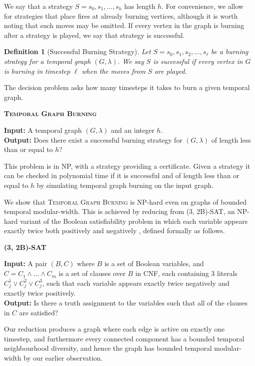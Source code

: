 \documentclass[preprint,12pt]{elsarticle}
\makeatletter
\newtheorem{definition}{Definition}
\newcommand{\decisionproblem}[3]{%
\begin{framed}
\vspace{0,1cm} \noindent
 \textbf{\textsc{#1} }
\par%
\noindent
{\bf{Input:}}  #2\\%
{\bf{Output:}} #3%
\end{framed}
}
\makeatother
\begin{document}
We say that a strategy $S = s_0, s_1, ..., s_h$ has length $h$. For convenience, we allow for strategies that place fires at already burning vertices, although it is worth noting that such moves may be omitted. If every vertex in the graph is burning after a strategy is played, we say that strategy is successful.

\begin{definition}[Successful Burning Strategy]
\label{def:burnstrat}
Let $S = s_0, s_1, s_2, ..., s_\ell$ be a burning strategy for a temporal graph $(G, \lambda)$. We say $S$ is \emph{successful} if every vertex in $G$ is burning in timestep $\ell$ when the moves from $S$ are played.
\end{definition}

The decision problem asks how many timesteps it takes to burn a given temporal graph.

\decisionproblem{Temporal Graph Burning}{A temporal graph $(G, \lambda)$ and an integer $h$.}{Does there exist a  successful burning strategy for $(G, \lambda)$ of length less than or equal to $h$?}

This problem is in NP, with a strategy providing a certificate. Given a strategy it can be checked in polynomial time if it is successful and of length less than or equal to $h$ by simulating temporal graph burning on the input graph.

We show that \textsc{Temporal Graph Burning} is NP-hard even on graphs of bounded temporal modular-width. This is achieved by reducing from \textsc{(3, 2B)-SAT}, an NP-hard variant of the Boolean satisfiability problem in which each variable appears exactly twice both positively and negatively \cite{DBLP:journals/eccc/ECCC-TR03-049}, defined formally as follows. 

\decisionproblem{(3, 2B)-SAT}{A pair $(B, C)$ where $B$ is a set of Boolean variables, and $C=C_1 \land ... \land C_m$ is a set of clauses over $B$ in CNF, each containing 3 literals $C_j^1 \lor C_j^2 \lor C_j^3$, such that each variable appears exactly twice negatively and exactly twice positively.}{Is there a truth assignment to the variables such that all of the clauses in $C$ are satisfied?}

Our reduction produces a graph where each edge is active on exactly one timestep, and furthermore every connected component has a bounded temporal neighbourhood diversity, and hence the graph has bounded temporal modular-width by our earlier observation.
\end{document}
